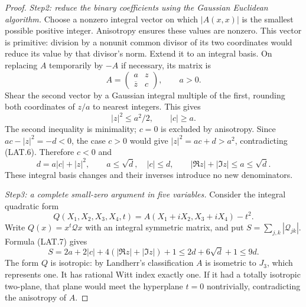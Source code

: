\begin{proof}
\emph{Step2: reduce the binary coefficients using the Gaussian
Euclidean algorithm.}  Choose a nonzero integral vector on
which $|A(x,x)|$ is the smallest possible positive integer.
Anisotropy ensures these values are nonzero.  This vector is
primitive: division by a nonunit common divisor of its two
coordinates would reduce its value by that divisor's norm.
Extend it to an integral basis.  On replacing $A$ temporarily
by $-A$ if necessary, its matrix is
\[
                    A=\begin{pmatrix}a&z\\\overline z&c\end{pmatrix},
                       \qquad a>0.
\]
Shear the second vector by a Gaussian integral multiple of the
first, rounding both coordinates of $z/a$ to nearest integers.
This gives
\[
       |z|^2\le a^2/2,\qquad |c|\ge a.                       \tag{LAT.6}
\]
The second inequality is minimality; $c=0$ is excluded by
anisotropy.  Since $ac-|z|^2=-d<0$, the case $c>0$ would give
$|z|^2=ac+d>a^2$, contradicting (LAT.6).  Therefore $c<0$ and
\[
 d=a|c|+|z|^2,\qquad a\le\sqrt d,\quad |c|\le d,
 \qquad |\Re z|+|\Im z|\le a\le\sqrt d.                      \tag{LAT.7}
\]
These integral basis changes and their inverses introduce no
new denominators.

\emph{Step3: a complete small-zero argument in five variables.}
Consider the integral quadratic form
\[
 Q(X_1,X_2,X_3,X_4,t)
       =A(X_1+iX_2,X_3+iX_4)-t^2.
\]
Write $Q(x)=x^t\mathcal Qx$ with an integral symmetric matrix,
and put $S=\sum_{j,k}|\mathcal Q_{jk}|$.  Formula (LAT.7) gives
\[
 S=2a+2|c|+4(|\Re z|+|\Im z|)+1
                    \le2d+6\sqrt d+1\le9d.                  \tag{LAT.8}
\]
The form $Q$ is isotropic: by Landherr's classification $A$ is
isometric to $J_3$, which represents one.  It has rational Witt
index exactly one.  If it had a totally isotropic two-plane,
that plane would meet the hyperplane $t=0$ nontrivially,
contradicting the anisotropy of $A$.


\end{proof}
